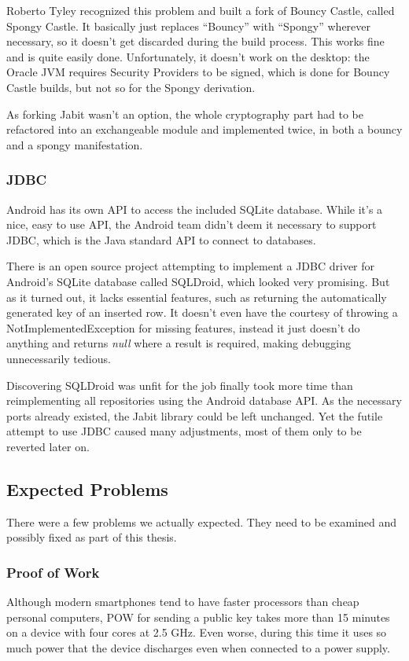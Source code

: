 \documentclass{bfh}
\begin{document}
  Roberto Tyley recognized this problem and built a fork of Bouncy Castle, called Spongy Castle.\cite{spongy} It basically just replaces “Bouncy” with “Spongy” wherever necessary, so it doesn’t get discarded during the build process. This works fine and is quite easily done. Unfortunately, it doesn’t work on the desktop: the Oracle JVM requires Security Providers to be signed, which is done for Bouncy Castle builds, but not so for the Spongy derivation.

  As forking Jabit wasn’t an option, the whole cryptography part had to be refactored into an exchangeable module and implemented twice, in both a bouncy and a spongy manifestation.

  \subsubsection{JDBC}
  \label{subsec:jdbc}
  Android has its own \ac{API} to access the included SQLite database. While it’s a nice, easy to use \ac{API}, the Android team didn’t deem it necessary to support \acs{JDBC}, which is the Java standard API to connect to databases.

  There is an open source project attempting to implement a \ac{JDBC} driver for Android’s SQLite database called SQLDroid, which looked very promising. But as it turned out, it lacks essential features, such as returning the automatically generated key of an inserted row. It doesn't even have the courtesy of throwing a NotImplementedException for missing features, instead it just doesn't do anything and returns \textit{null} where a result is required, making debugging unnecessarily tedious.\cite{github:sqldroid}

  Discovering SQLDroid was unfit for the job finally took more time than reimplementing all repositories using the Android database API. As the necessary ports already existed, the Jabit library could be left unchanged. Yet the futile attempt to use JDBC caused many adjustments, most of them only to be reverted later on.

  \subsection{Expected Problems}
  There were a few problems we actually expected. They need to be examined and possibly fixed as part of this thesis.

  \subsubsection{Proof of Work}
  Although modern smartphones tend to have faster processors than cheap personal computers, \acf{POW} for sending a public key takes more than 15 minutes on a device with four cores at 2.5 GHz. Even worse, during this time it uses so much power that the device discharges even when connected to a power supply.
\end{document}
